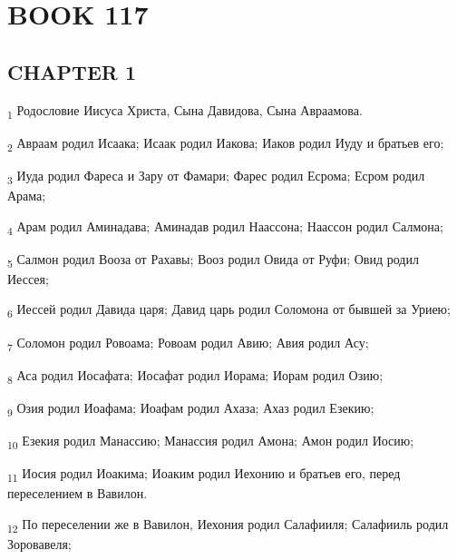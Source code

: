 \section{BOOK 117}
\subsection{CHAPTER 1}
\begin{tcolorbox}
\textsubscript{1} Родословие Иисуса Христа, Сына Давидова, Сына Авраамова.
\end{tcolorbox}
\begin{tcolorbox}
\textsubscript{2} Авраам родил Исаака; Исаак родил Иакова; Иаков родил Иуду и братьев его;
\end{tcolorbox}
\begin{tcolorbox}
\textsubscript{3} Иуда родил Фареса и Зару от Фамари; Фарес родил Есрома; Есром родил Арама;
\end{tcolorbox}
\begin{tcolorbox}
\textsubscript{4} Арам родил Аминадава; Аминадав родил Наассона; Наассон родил Салмона;
\end{tcolorbox}
\begin{tcolorbox}
\textsubscript{5} Салмон родил Вооза от Рахавы; Вооз родил Овида от Руфи; Овид родил Иессея;
\end{tcolorbox}
\begin{tcolorbox}
\textsubscript{6} Иессей родил Давида царя; Давид царь родил Соломона от бывшей за Уриею;
\end{tcolorbox}
\begin{tcolorbox}
\textsubscript{7} Соломон родил Ровоама; Ровоам родил Авию; Авия родил Асу;
\end{tcolorbox}
\begin{tcolorbox}
\textsubscript{8} Аса родил Иосафата; Иосафат родил Иорама; Иорам родил Озию;
\end{tcolorbox}
\begin{tcolorbox}
\textsubscript{9} Озия родил Иоафама; Иоафам родил Ахаза; Ахаз родил Езекию;
\end{tcolorbox}
\begin{tcolorbox}
\textsubscript{10} Езекия родил Манассию; Манассия родил Амона; Амон родил Иосию;
\end{tcolorbox}
\begin{tcolorbox}
\textsubscript{11} Иосия родил Иоакима; Иоаким родил Иехонию и братьев его, перед переселением в Вавилон.
\end{tcolorbox}
\begin{tcolorbox}
\textsubscript{12} По переселении же в Вавилон, Иехония родил Салафииля; Салафииль родил Зоровавеля;
\end{tcolorbox}
